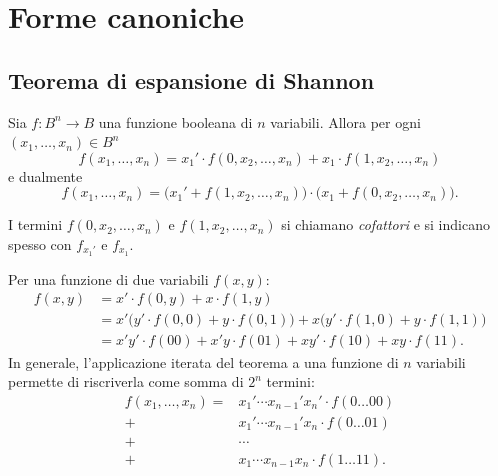 \documentclass[11pt,a4paper]{article}
\begin{document}
\section{Forme canoniche}

\subsection{Teorema di espansione di Shannon}

\begin{teorema}
Sia $f \colon B^n \to B$ una funzione booleana di $n$ variabili. Allora per
ogni $(x_1, \dots, x_n) \in B^n$
\[
  f(x_1, \dots, x_n) = x_1' \cdot f(0, x_2, \dots, x_n)
                     + x_1 \cdot f(1, x_2, \dots, x_n)
\]
e dualmente
\[
  f(x_1, \dots, x_n) = \bigl(x_1' + f(1, x_2, \dots, x_n)\bigr)
                       \cdot \bigl(x_1 + f(0, x_2, \dots, x_n)\bigr).
\]
\end{teorema}

I termini $f(0, x_2, \dots, x_n)$ e $f(1, x_2, \dots, x_n)$ si chiamano
\emph{cofattori} e si indicano spesso con $f_{x_1'}$ e $f_{x_1}$.

\begin{esempio}
Per una funzione di due variabili $f(x,y)$:
\begin{align*}
f(x,y) &= x' \cdot f(0,y) + x \cdot f(1,y)\\
       &= x' \bigl(y' \cdot f(0,0) + y \cdot f(0,1)\bigr)
          + x \bigl(y' \cdot f(1,0) + y \cdot f(1,1)\bigr)\\
       &= x'y' \cdot f(00) + x'y \cdot f(01) + xy' \cdot f(10) + xy \cdot f(11).
\end{align*}
In generale, l'applicazione iterata del teorema a una funzione di $n$ variabili
permette di riscriverla come somma di $2^n$ termini:
\begin{align*}
f(x_1,\dots,x_n) = {}& x_1' \cdots x_{n-1}' x_n' \cdot f(0\dots00)\\
 + {}& x_1' \cdots x_{n-1}' x_n \cdot f(0\dots01)\\
 + {}& \cdots\\
 + {}& x_1 \cdots x_{n-1} x_n \cdot f(1\dots11).
\end{align*}
\end{esempio}
\end{document}
